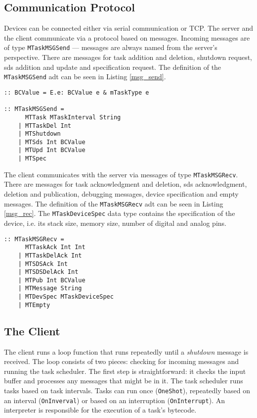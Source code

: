 \subsection{Communication Protocol}

Devices can be connected either via serial communication or TCP. The server and the client communicate via a protocol based on messages. Incoming messages are of type \texttt{MTaskMSGSend} --- messages are always named from the server's perspective. There are messages for task addition and deletion, shutdown request, \ac{sds} addition and update and specification request. The definition of the \texttt{MTaskMSGSend} \ac{adt} can be seen in Listing \ref{msg_send}.

\begin{lstlisting}[caption=Communication protocol: sent messages,captionpos=b,label=msg_send]
:: BCValue = E.e: BCValue e & mTaskType e

:: MTaskMSGSend = 
      MTTask MTaskInterval String
    | MTTaskDel Int
    | MTShutdown
    | MTSds Int BCValue
    | MTUpd Int BCValue
    | MTSpec
\end{lstlisting}

The client communicates with the server via messages of type \texttt{MTaskMSGRecv}. There are messages for task acknowledgment and deletion, \ac{sds} acknowledgment, deletion and publication, debugging messages, device specification and empty messages. The definition of the \texttt{MTaskMSGRecv} \ac{adt} can be seen in Listing \ref{msg_rec}. The \texttt{MTaskDeviceSpec} data type contains the specification of the device, i.e. its stack size, memory size, number of digital and analog pins.

\begin{lstlisting}[caption=Communication protocol: received messages,captionpos=b,label=msg_rec]
:: MTaskMSGRecv = 
      MTTaskAck Int Int
    | MTTaskDelAck Int
    | MTSDSAck Int
    | MTSDSDelAck Int
    | MTPub Int BCValue
    | MTMessage String
    | MTDevSpec MTaskDeviceSpec
    | MTEmpty
\end{lstlisting}

\subsection{The Client}

The client runs a loop function that runs repeatedly until a \textit{shutdown} message is received. The loop consists of two pieces: checking for incoming messages and running the task scheduler. The first step is straightforward: it checks the input buffer and processes any messages that might be in it. The task scheduler runs tasks based on task intervals. Tasks can run once (\texttt{OneShot}), repeatedly based on an interval (\texttt{OnInverval}) or based on an interruption (\texttt{OnInterrupt}). An interpreter is responsible for the execution of a task's bytecode.

